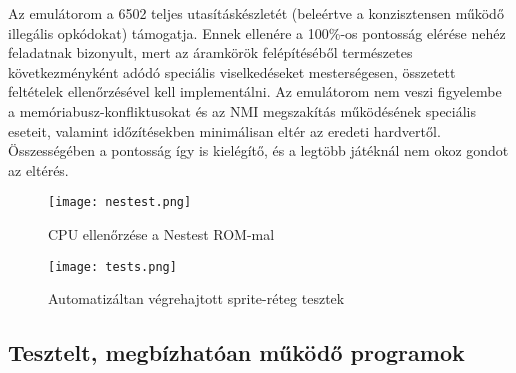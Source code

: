 Az emulátorom a 6502 teljes utasításkészletét (beleértve a konzisztensen működő illegális opkódokat) támogatja. Ennek ellenére a 100\%-os pontosság elérése nehéz feladatnak bizonyult, mert az áramkörök felépítéséből természetes következményként adódó speciális viselkedéseket mesterségesen, összetett feltételek ellenőrzésével kell implementálni. Az emulátorom nem veszi figyelembe a memóriabusz-konfliktusokat és az NMI megszakítás működésének speciális eseteit, valamint időzítésekben minimálisan eltér az eredeti hardvertől. Összességében a pontosság így is kielégítő, és a legtöbb játéknál nem okoz gondot az eltérés.

\vspace{0.2cm}
\begin{figure}[H]
	\centering
	\texttt{[image: nestest.png]}
	\caption{CPU ellenőrzése a Nestest ROM-mal}
\end{figure}


\begin{figure}[H]
	\centering
	\texttt{[image: tests.png]}
	\caption{Automatizáltan végrehajtott sprite-réteg tesztek}
\end{figure}

\subsection{Tesztelt, megbízhatóan működő programok}


